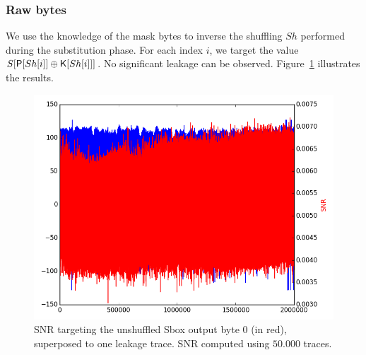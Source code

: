 \subsubsection{Raw bytes}
We use the knowledge of the mask bytes to inverse the shuffling $Sh$ performed during the substitution phase. For each index $i$, we target the value $S[\mathsf{P}[Sh[i]]\oplus \mathsf{K}[Sh[i]]] $. No significant leakage can be observed. 
Figure~\ref{fig:SNR_unshuffledS0} illustrates the results.
\begin{figure}[H]
	\centering 
	\includegraphics[scale=0.35]{figures/2Mpts/SNR_unshuffled_S0_50ktraces.png}
	\caption{SNR targeting the unshuffled Sbox output byte 0 (in red), superposed to one leakage trace. SNR computed using $50.000$ traces.}
	\label{fig:SNR_unshuffledS0}
\end{figure}

